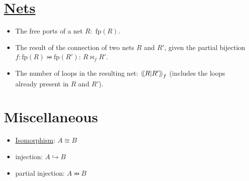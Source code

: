 \section{\texorpdfstring{\hyperref[nets]{Nets}}{Nets}}

\begin{itemize}
\item The free ports of a net $R$:~$\mathrm{fp}(R)$.
\item The result of the connection of two nets
  $R$ and
  $R'$, given
  the partial bijection
  $f:\mathrm{fp}(R)\pinj
  \mathrm{fp}(R')$:
  $R\bowtie_f
  R'$.
\item The number of loops in the resulting net:
  $\left\langle\!\left\langle R\middle|R'\right\rangle\!\right\rangle_f$
  (includes the loops already present in
  $R$ and
  $R'$).
\end{itemize}

\section{Miscellaneous}\label{miscellaneous}

\begin{itemize}
\item \hyperref[isomorphism]{Isomorphism}: $A\cong B$
\item injection: $A\hookrightarrow B$
\item partial injection: $A\pinj B$
\end{itemize}

